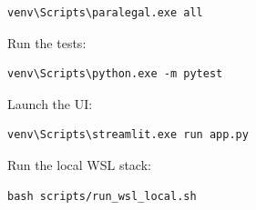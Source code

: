 \documentclass[11pt]{article}
\begin{document}
\begin{verbatim}
venv\Scripts\paralegal.exe all
\end{verbatim}

Run the tests:

\begin{verbatim}
venv\Scripts\python.exe -m pytest
\end{verbatim}

Launch the UI:

\begin{verbatim}
venv\Scripts\streamlit.exe run app.py
\end{verbatim}

Run the local WSL stack:

\begin{verbatim}
bash scripts/run_wsl_local.sh
\end{verbatim}
\end{document}
